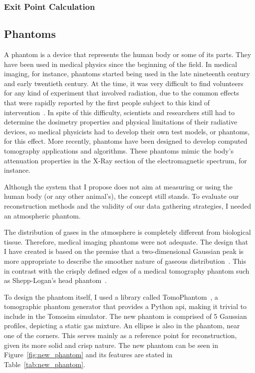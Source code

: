 \subsubsection{Exit Point Calculation}%
\label{ssub:exit_point_calculation}



\subsection{Phantoms}%
\label{sub:phantoms}

A phantom is a device that represents the human body or some of its
parts. They have been used in medical physics since the beginning of the
field. In medical imaging, for instance, phantoms started being used in
the late nineteenth century and early twentieth century. At the time, it
was very difficult to find volunteers for any kind of experiment that
involved radiation, due to the common effects that were rapidly reported
by the first people subject to this kind of
intervention~\cite{Dewerd2014}. In spite of this difficulty, scientists
and researchers still had to determine the dosimetry properties and
physical limitations of their radiative devices, so medical physicists
had to develop their own test models, or phantoms, for this effect. More
recently, phantoms have been designed to develop computed tomography
applications and algorithms. These phantoms mimic the body's attenuation
properties in the X-Ray section of the electromagnetic spectrum, for
instance.

Although the system that I propose does not aim at measuring or using
the human body (or any other animal's), the concept still stands. To
evaluate our reconstruction methods and the validity of our data
gathering strategies, I needed an atmospheric phantom.

The distribution of gases in the atmosphere is completely different from
biological tissue. Therefore, medical imaging phantoms were not
adequate. The design that I have created is based on the premise that a
two-dimensional Gaussian peak is more appropriate to describe the
smoother nature of gaseous distribution~\cite{Stachniss2009}. This in
contrast with the crisply defined edges of a medical tomography phantom
such as Shepp-Logan's head phantom~\cite{Shepp1974}.

To design the phantom itself, I used a library called
TomoPhantom~\cite{Kazantsev2018}, a tomographic phantom generator that
provides a Python \gls{api}, making it trivial to include in the Tomosim
simulator. The new phantom is comprised of 5 Gaussian profiles,
depicting a static gas mixture. An ellipse is also in the phantom, near
one of the corners. This serves mainly as a reference point for
reconstruction, given its more solid and crisp nature. The new phantom
can be seen in Figure~\ref{fig:new_phantom} and its features are stated
in Table~\ref{tab:new_phantom}.


